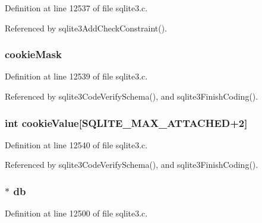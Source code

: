 Definition at line 12537 of file sqlite3.\+c.



Referenced by sqlite3\+Add\+Check\+Constraint().

\hypertarget{struct_parse_a83a8d0c8ab1f8283a1023308a2b63e36}{}
\subsubsection[{cookie\+Mask}]{ cookie\+Mask}\label{struct_parse_a83a8d0c8ab1f8283a1023308a2b63e36}


Definition at line 12539 of file sqlite3.\+c.



Referenced by sqlite3\+Code\+Verify\+Schema(), and sqlite3\+Finish\+Coding().

\hypertarget{struct_parse_a74ad814028af05ec5642589b5fffcc35}{}
\subsubsection[{cookie\+Value}]{\setlength{\rightskip}{0pt plus 5cm}int cookie\+Value\mbox{[}{\bf S\+Q\+L\+I\+T\+E\+\_\+\+M\+A\+X\+\_\+\+A\+T\+T\+A\+C\+H\+E\+D}+2\mbox{]}}\label{struct_parse_a74ad814028af05ec5642589b5fffcc35}


Definition at line 12540 of file sqlite3.\+c.



Referenced by sqlite3\+Code\+Verify\+Schema(), and sqlite3\+Finish\+Coding().

\hypertarget{struct_parse_ad6e663497d2c934364b3bcf07496b30b}{}
\subsubsection[{db}]{$\ast$ db}\label{struct_parse_ad6e663497d2c934364b3bcf07496b30b}


Definition at line 12500 of file sqlite3.\+c.



